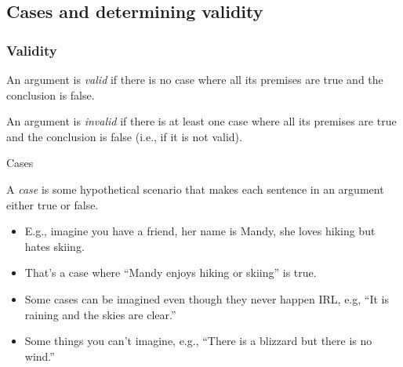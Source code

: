 \subsection{Cases and determining validity}

\begin{frame}
  \frametitle{Validity}

  \begin{definition}
  An argument is \emph{valid} if there is no case where all its
  premises are true and the conclusion is false.
  \end{definition}

  \begin{definition}
  An argument is \emph{invalid} if there is at least one case where
  all its premises are true and the conclusion is false (i.e., if it
  is not valid).
  \end{definition}
\end{frame}

\begin{frame}{Cases}
  
\begin{definition}
  A \emph{case} is some hypothetical scenario that makes each sentence
  in an argument either true or false.
\end{definition}

\begin{itemize}[<+->]
  \item E.g., imagine you have a friend, her name is Mandy, she loves
  hiking but hates skiing.
  \item That's a case where ``Mandy enjoys hiking or skiing'' is true.
  \item Some cases can be imagined even though they never happen IRL, e.g,
  ``It is raining and the skies are clear.''
  \item Some things you can't imagine, e.g.,
  ``There is a blizzard but there is no wind.''
\end{itemize}

\end{frame}

